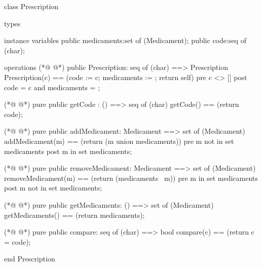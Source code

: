 \begin{vdmpp}[breaklines=true]
class Prescription

types

instance variables
  public medicaments:set of (Medicament);
  public code:seq of (char);
  
operations
(*@
\label{Prescription:10}
@*)
 public Prescription: seq of (char) ==> Prescription
  Prescription(c) == (code := c; medicaments := {}; return self)
 pre c <> []
 post code = c and medicaments = {};
 
(*@
\label{getCode:15}
@*)
 pure public getCode : () ==> seq of (char)
  getCode() == (return code);
  
(*@
\label{addMedicament:18}
@*)
 pure public addMedicament: Medicament ==> set of (Medicament)
  addMedicament(m) == (return ({m} union medicaments))
 pre m not in set medicaments
 post m in set medicaments;
  
(*@
\label{removeMedicament:23}
@*)
 pure public removeMedicament: Medicament ==> set of (Medicament)
  removeMedicament(m) == (return (medicaments \ {m}))
 pre m in set medicaments
 post m not in set medicaments;
  
(*@
\label{getMedicaments:28}
@*)
 pure public getMedicaments: () ==> set of (Medicament)
  getMedicaments() == (return medicaments);
  
(*@
\label{compare:31}
@*)
 pure public compare: seq of (char) ==> bool
  compare(c) == (return c = code);

end Prescription
\end{vdmpp}
